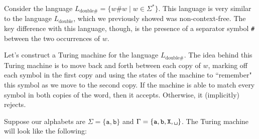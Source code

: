 \begin{example}
Consider the language $L_{\text{double\#}} = \{w\texttt{\#}w \mid w \in \Sigma^{*}\}$. This language is very similar to the language $L_{\text{double}}$, which we previously showed was non-context-free. The key difference with this language, though, is the presence of a separator symbol \texttt{\#} between the two occurrences of $w$.

Let's construct a Turing machine for the language $L_{\text{double\#}}$. The idea behind this Turing machine is to move back and forth between each copy of $w$, marking off each symbol in the first copy and using the states of the machine to ``remember" this symbol as we move to the second copy. If the machine is able to match every symbol in both copies of the word, then it accepts. Otherwise, it (implicitly) rejects.

Suppose our alphabets are $\Sigma = \{\texttt{a}, \texttt{b}\}$ and $\Gamma = \{\texttt{a}, \texttt{b}, \texttt{X}, \blankspace\}$. The Turing machine will look like the following:
\begin{center}
\end{center}
\end{example}
